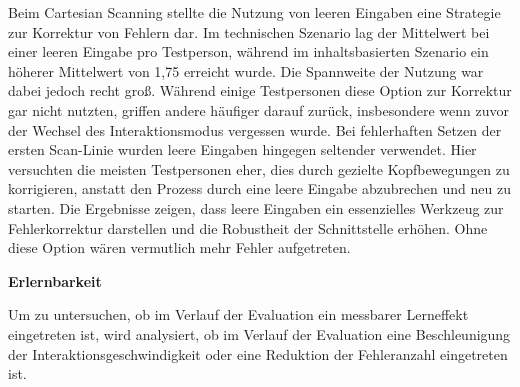 Beim Cartesian Scanning stellte die Nutzung von leeren Eingaben eine Strategie zur Korrektur von Fehlern dar. Im technischen Szenario lag der Mittelwert bei einer leeren Eingabe pro Testperson, während im inhaltsbasierten Szenario ein höherer Mittelwert von 1,75 erreicht wurde. Die Spannweite der Nutzung war dabei jedoch recht groß. Während einige Testpersonen diese Option zur Korrektur gar nicht nutzten, griffen andere häufiger darauf zurück, insbesondere wenn zuvor der Wechsel des Interaktionsmodus vergessen wurde. Bei fehlerhaften Setzen der ersten Scan-Linie wurden leere Eingaben hingegen seltender verwendet. Hier versuchten die meisten Testpersonen eher, dies durch gezielte Kopfbewegungen zu korrigieren, anstatt den Prozess durch eine leere Eingabe abzubrechen und neu zu starten. 
Die Ergebnisse zeigen, dass leere Eingaben ein essenzielles Werkzeug zur Fehlerkorrektur darstellen und die Robustheit der Schnittstelle erhöhen. Ohne diese Option wären vermutlich mehr Fehler aufgetreten. 

\textbf{Erlernbarkeit}

Um zu untersuchen, ob im Verlauf der Evaluation ein messbarer Lerneffekt eingetreten ist, wird analysiert, ob im Verlauf der Evaluation eine Beschleunigung der Interaktionsgeschwindigkeit oder eine Reduktion der Fehleranzahl eingetreten ist.

